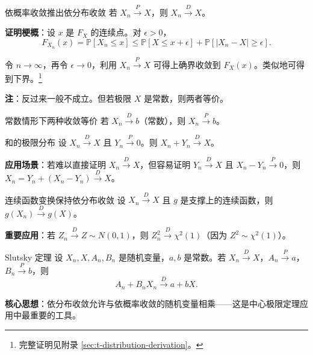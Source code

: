 \begin{theorem}{依概率收敛推出依分布收敛}\label{th:prob-to-dist}
若 $X_n \xrightarrow{P} X$，则 $X_n \xrightarrow{D} X$。
\end{theorem}

\textbf{证明梗概}：设 $x$ 是 $F_X$ 的连续点。对 $\epsilon > 0$，
\[
F_{X_n}(x) = \mathbb{P}[X_n \leq x] \leq \mathbb{P}[X \leq x + \epsilon] + \mathbb{P}[|X_n - X| \geq \epsilon].
\]

令 $n \to \infty$，再令 $\epsilon \to 0$，利用 $X_n \xrightarrow{P} X$ 可得上确界收敛到 $F_X(x)$。类似地可得到下界。\footnote{完整证明见附录 \cref{sec:t-distribution-derivation}。}

\textbf{注}：反过来一般不成立。但若极限 $X$ 是常数，则两者等价。

\begin{theorem}{常数情形下两种收敛等价}\label{th:constant-equivalence}
若 $X_n \xrightarrow{D} b$（常数），则 $X_n \xrightarrow{P} b$。
\end{theorem}

\begin{theorem}{和的极限分布}\label{th:sum-convergence}
设 $X_n \xrightarrow{D} X$ 且 $Y_n \xrightarrow{P} 0$。则 $X_n + Y_n \xrightarrow{D} X$。
\end{theorem}

\textbf{应用场景}：若难以直接证明 $X_n \xrightarrow{D} X$，但容易证明 $Y_n \xrightarrow{D} X$ 且 $X_n - Y_n \xrightarrow{P} 0$，则 $X_n = Y_n + (X_n - Y_n) \xrightarrow{D} X$。

\begin{theorem}{连续函数变换保持依分布收敛}\label{th:continuous-distribution}
设 $X_n \xrightarrow{D} X$ 且 $g$ 是支撑上的连续函数，则 $g(X_n) \xrightarrow{D} g(X)$。
\end{theorem}

\textbf{重要应用}：若 $Z_n \xrightarrow{D} Z \sim N(0,1)$，则 $Z_n^2 \xrightarrow{D} \chi^2(1)$（因为 $Z^2 \sim \chi^2(1)$）。

\begin{theorem}{Slutsky 定理}\label{th:slutsky}
设 $X_n, X, A_n, B_n$ 是随机变量，$a, b$ 是常数。若 $X_n \xrightarrow{D} X$，$A_n \xrightarrow{P} a$，$B_n \xrightarrow{P} b$，则
\[
A_n + B_n X_n \xrightarrow{D} a + bX.
\label{eq:slutsky-theorem}
\]
\end{theorem}

\textbf{核心思想}：依分布收敛允许与依概率收敛的随机变量相乘——这是中心极限定理应用中最重要的工具。%

